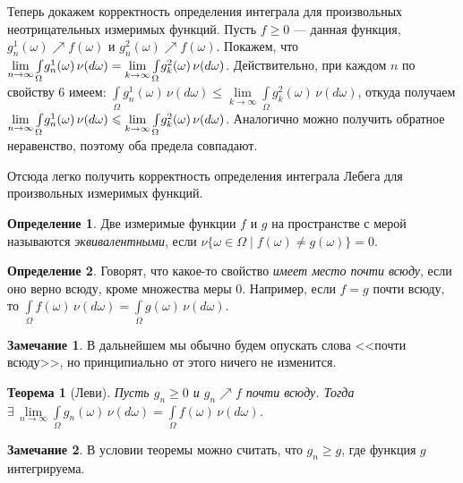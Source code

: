 \documentclass[12pt,titlepage]{article}
\newcounter{tema}
\newtheorem{theorem}{Теорема}[tema]
\theoremstyle{definition}
\newtheorem{defen}{Определение}[tema]
\newtheorem*{zam}{Замечание}
\newcommand*{\p}[1]{#1\nobreak\discretionary{}{\hbox{$\mathsurround=0pt #1$}}{}}
\begin{document}
Теперь докажем корректность определения интеграла для произвольных
неотрицательных измеримых функций. Пусть $f\geqslant 0$ --- данная
функция, $g_n^1(\omega)\nearrow f(\omega)$ и $g_n^2(\omega)\nearrow
f(\omega)$. Покажем, что
$\lim\limits_{n\to\infty}\int\limits_\Omega\!
g_n^1(\omega)\,\nu(d\omega)\p=\lim\limits_{k\to\infty}\int\limits_\Omega\!
g_k^2(\omega)\,\nu(d\omega)$. Действительно, при каждом $n$ по
свойству 6 имеем: $\int\limits_\Omega\!
g_n^1(\omega)\,\nu(d\omega)\leqslant
\lim\limits_{k\to\infty}\int\limits_\Omega\!
g_k^2(\omega)\,\nu(d\omega)$, откуда получаем
$\lim\limits_{n\to\infty}\int\limits_\Omega\!
g_n^1(\omega)\,\nu(d\omega)\p\leqslant\lim\limits_{k\to\infty}\int\limits_\Omega\!
g_k^2(\omega)\,\nu(d\omega)$. Аналогично можно получить обратное
неравенство, поэтому оба предела совпадают.

Отсюда легко получить корректность определения интеграла Лебега для
произвольных измеримых функций.

\begin{defen}
Две измеримые функции $f$ и $g$ на пространстве с мерой называются
\emph{эквивалентными}, если $\nu\{\omega\in\Omega\mid f(\omega)\neq
g(\omega)\}=0$.
\end{defen}

\begin{defen}
Говорят, что какое-то свойство \emph{имеет место почти всюду}, если
оно верно всюду, кроме множества меры 0. Например, если $f=g$ почти
всюду, то $\int\limits_\Omega\!
f(\omega)\,\nu(d\omega)=\int\limits_\Omega\!
g(\omega)\,\nu(d\omega)$.
\end{defen}

\begin{zam}
В дальнейшем мы обычно будем опускать слова <<почти всюду>>, но
принципиально от этого ничего не изменится.
\end{zam}

\begin{theorem}[Леви]
Пусть $g_n\geqslant 0$ и $g_n\nearrow f$ почти всюду. Тогда
$\exists\,\lim\limits_{n\to\infty}\int\limits_\Omega\!
g_n(\omega)\,\nu(d\omega)=\int\limits_\Omega\!
f(\omega)\,\nu(d\omega)$.
\end{theorem}

\begin{zam}
В условии теоремы можно считать, что $g_n\geqslant g$, где функция
$g$ интегрируема.
\end{zam}
\end{document}
